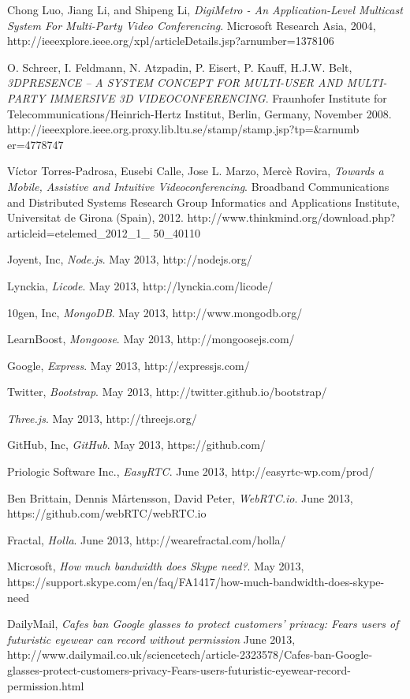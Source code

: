 \documentclass[12pt, titlepage]{article}
\begin{document}
\begin{thebibliography}{9}
Chong Luo, Jiang Li, and Shipeng Li,
\emph{DigiMetro - An Application-Level Multicast System For Multi-Party Video Conferencing}.
Microsoft Research Asia,
2004,
http://ieeexplore.ieee.org/xpl/articleDetails.jsp?arnumber=1378106

O. Schreer, I. Feldmann, N. Atzpadin, P. Eisert, P. Kauff, H.J.W. Belt, 
\emph{3DPRESENCE – A SYSTEM CONCEPT FOR MULTI-USER AND MULTI-PARTY IMMERSIVE 3D VIDEOCONFERENCING}.
Fraunhofer Institute for Telecommunications/Heinrich-Hertz Institut, Berlin, Germany, November 2008.
http://ieeexplore.ieee.org.proxy.lib.ltu.se/stamp/stamp.jsp?tp=\&arnumb er=4778747

Víctor Torres-Padrosa, Eusebi Calle, Jose L. Marzo, Mercè Rovira,
\emph{Towards a Mobile, Assistive and Intuitive Videoconferencing}.
Broadband Communications and Distributed Systems Research Group Informatics and Applications Institute, Universitat de Girona (Spain), 2012.
http://www.thinkmind.org/download.php?articleid=etelemed\_2012\_1\_ 50\_40110

  Joyent, Inc,
  \emph{Node.js}.
  May 2013,
  http://nodejs.org/
  
  Lynckia,
  \emph{Licode}.
  May 2013,
  http://lynckia.com/licode/
  
  10gen, Inc,
  \emph{MongoDB}.
  May 2013,
  http://www.mongodb.org/
  
  LearnBoost,
  \emph{Mongoose}.
  May 2013,
  http://mongoosejs.com/
  
  Google,
  \emph{Express}.
  May 2013,
  http://expressjs.com/
  
  Twitter,
  \emph{Bootstrap}.
  May 2013,
  http://twitter.github.io/bootstrap/
  
  \emph{Three.js}.
  May 2013,
  http://threejs.org/
  
  GitHub, Inc,
  \emph{GitHub}.
  May 2013,
  https://github.com/
  
  Priologic Software Inc.,
  \emph{EasyRTC}.
  June 2013,
  http://easyrtc-wp.com/prod/

  Ben Brittain, Dennis Mårtensson, David Peter,
  \emph{WebRTC.io}.
  June 2013,
  https://github.com/webRTC/webRTC.io
  
  Fractal,
  \emph{Holla}.
  June 2013,
   http://wearefractal.com/holla/

Microsoft,
\emph{ How much bandwidth does Skype need?}.
May 2013,
https://support.skype.com/en/faq/FA1417/how-much-bandwidth-does-skype-need

DailyMail,
\emph{ Cafes ban Google glasses to protect customers' privacy: Fears users of futuristic eyewear can record without permission}
June 2013,
http://www.dailymail.co.uk/sciencetech/article-2323578/Cafes-ban-Google-glasses-protect-customers-privacy-Fears-users-futuristic-eyewear-record-permission.html

\end{thebibliography}
\end{document}
